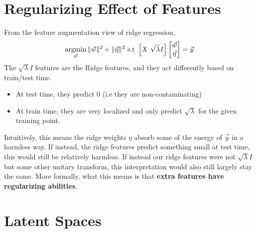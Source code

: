 \section{Regularizing Effect of Features}
From the feature augmentation view of ridge regression,
\[
  \operatorname*{argmin}_{\vec{w}}\|\vec{w}\|^2+\|\vec{\eta}\|^2 \text{ s.t } \left[ X \ \sqrt{\lambda} I \right]\begin{bmatrix}
    \vec{w}\\
    \vec{\eta}
  \end{bmatrix} = \vec{y}
\]
The $\sqrt{\lambda} I $ features are the Ridge features, and they act differently based on train/test time.
\begin{itemize}
  \item At test time, they predict 0 (i.e they are non-contaminating)
  \item At train time, they are very localized and only predict $\sqrt{\lambda}$ for the given training point.
\end{itemize}
Intuitively, this means the ridge weights $\eta$ absorb some of the energy of $\vec{y}$ in a harmless way. If instead, the ridge features predict something small at test time, this would still be relatively harmless. If instead our ridge features were not $\sqrt{\lambda}I$ but some other unitary transform, this interpretation would also still largely stay the same.
More formally, what this means is that \textbf{extra features have regularizing abilities}.
\section{Latent Spaces}
